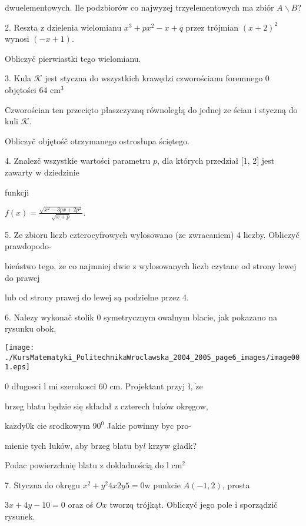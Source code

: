 \documentclass[a4paper,12pt]{article}
\begin{document}
dwuelementowych. Ile podzbiorów co najwyzej trzyelementowych ma zbiór $A\backslash B$?

2. Reszta $\mathrm{z}$ dzielenia wielomianu $x^{3}+px^{2}-x+q$ przez trójmian $(x+2)^{2}$ wynosi $(-x+1).$

Obliczyč pierwiastki tego wielomianu.

3. Kula $\mathcal{K}$ jest styczna do wszystkich krawędzi czworościanu foremnego $0$ objętości 64 $\mathrm{c}\mathrm{m}^{3}$

Czworościan ten przecięto płaszczyznq równoległą do jednej ze ścian $\mathrm{i}$ styczną do kuli $\mathcal{K}.$

Obliczyč objętośč otrzymanego ostrosłupa ściętego.

4. Znalez$\acute{}$č wszystkie wartości parametru $p$, dla których przedział [1, 2] jest zawarty $\mathrm{w}$ dziedzinie

funkcji

$f(x)=\displaystyle \frac{\sqrt{x^{2}-3px+2p^{2}}}{\sqrt{x+p}}.$

5. Ze zbioru liczb czterocyfrowych wylosowano (ze zwracaniem) 4 liczby. Obliczyč prawdopodo-

bieństwo tego, $\dot{\mathrm{z}}\mathrm{e}$ co najmniej dwie $\mathrm{z}$ wylosowanych liczb czytane od strony lewej do prawej

lub od strony prawej do lewej są podzielne przez 4.

6. Nalezy wykonač stolik $0$ symetrycznym owalnym blacie, jak pokazano na rysunku obok,
\begin{center}
\texttt{[image: ./KursMatematyki\_PolitechnikaWroclawska\_2004\_2005\_page6\_images/image001.eps]}
\end{center}
$0$ długosci l $\mathrm{m}\mathrm{i}$ szerokosci 60 cm. Projektant przyj ł, $\dot{\mathrm{z}}\mathrm{e}$

brzeg blatu będzie się składał $\mathrm{z}$ czterech łuków okręgow,

$\mathrm{k}\mathrm{a}\dot{\mathrm{z}}\mathrm{d}\mathrm{y}0\mathrm{k}$ cie srodkowym $90^{0}$ Jakie powinny byc pro-

mienie tych łuków, aby brzeg blatu $\mathrm{b}\mathrm{y}l$ krzyw gładk?

Podac powierzchnię blatu $\mathrm{z}$ dokladnością do l $\mathrm{c}\mathrm{m}^{2}$

7. Styczna do okręgu $x^{2} + y^{2} 4x 2y 5 = 0 \mathrm{w}$ punkcie $A(-1,2)$, prosta

$3x+4y-10=0$ oraz oś $Ox$ tworzq trójkąt. Obliczyč jego pole $\mathrm{i}$ sporządzič rysunek.
\end{document}
